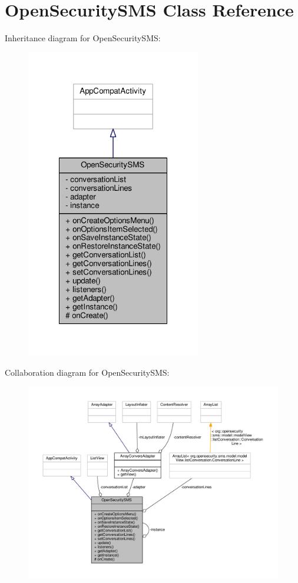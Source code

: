 \hypertarget{a00011}{\section{Open\+Security\+S\+M\+S Class Reference}
\label{a00011}
}


Inheritance diagram for Open\+Security\+S\+M\+S\+:
\nopagebreak
\begin{figure}[H]
\begin{center}
\leavevmode
\includegraphics[width=216pt]{a00081}
\end{center}
\end{figure}


Collaboration diagram for Open\+Security\+S\+M\+S\+:
\nopagebreak
\begin{figure}[H]
\begin{center}
\leavevmode
\includegraphics[width=350pt]{a00082}
\end{center}
\end{figure}
